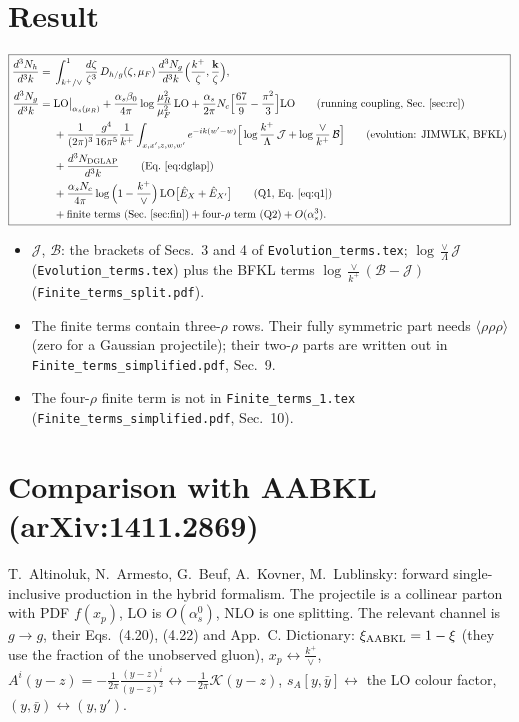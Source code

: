 \documentclass[9pt]{article}
\numberwithin{equation}{section}
\begin{document}
\section{Result}\label{sec:res}
\begin{equation}
\boxed{\begin{aligned}
\frac{d^3N_h}{d^3k}={}&\int_{k^+/\vee}^1\frac{d\zeta}{\zeta^3}\,D_{h/g}(\zeta,\mu_F)\,\frac{d^3N_g}{d^3k}\Big(\frac{k^+}{\zeta},\frac{\mathbf k}{\zeta}\Big),\\
\frac{d^3N_g}{d^3k}={}&{\rm LO}\big|_{\alpha_s(\mu_R)}+\frac{\alpha_s\beta_0}{4\pi}\log\frac{\mu_R^2}{\mu_F^2}\,{\rm LO}+\frac{\alpha_s}{2\pi}N_c\Big[\frac{67}{9}-\frac{\pi^2}{3}\Big]{\rm LO}\qquad\text{(running coupling, Sec.~\ref{sec:rc})}\\
&+\frac{1}{(2\pi)^{3}}\frac{g^{4}}{16\pi^{5}}\frac{1}{k^{+}}\int_{x,x',z,w,w'}e^{-ik(w'-w)}\Big[\log\frac{k^+}{\Lambda}\,\mathcal J+\log\frac{\vee}{k^+}\,\mathcal B\Big]\qquad\text{(evolution: JIMWLK, BFKL)}\\
&+\frac{d^3N_{\rm DGLAP}}{d^3k}\qquad\text{(Eq.~\eqref{eq:dglap})}\\
&+\frac{\alpha_sN_c}{4\pi}\log\Big(1-\frac{k^+}{\vee}\Big)\,{\rm LO}\big[\hat E_X+\hat E_{X'}\big]\qquad\text{(Q1, Eq.~\eqref{eq:q1})}\\
&+\text{finite terms (Sec.~\ref{sec:fin})}+\text{four-}\rho\text{ term (Q2)}+O(\alpha_s^3).
\end{aligned}}
\end{equation}
\begin{itemize}
\item $\mathcal J$, $\mathcal B$: the brackets of Secs.~3 and 4 of \texttt{Evolution\_terms.tex}; $\log\frac{\vee}{\Lambda}\mathcal J$ (\texttt{Evolution\_terms.tex}) plus the BFKL terms $\log\frac{\vee}{k^+}(\mathcal B-\mathcal J)$ (\texttt{Finite\_terms\_split.pdf}).
\item The finite terms contain three-$\rho$ rows. Their fully symmetric part needs $\langle\rho\rho\rho\rangle$ (zero for a Gaussian projectile); their two-$\rho$ parts are written out in \texttt{Finite\_terms\_simplified.pdf}, Sec.~9.
\item The four-$\rho$ finite term is not in \texttt{Finite\_terms\_1.tex} (\texttt{Finite\_terms\_simplified.pdf}, Sec.~10).
\end{itemize}

\section{Comparison with AABKL (arXiv:1411.2869)}\label{sec:aabkl}
T.~Altinoluk, N.~Armesto, G.~Beuf, A.~Kovner, M.~Lublinsky: forward single-inclusive production in the hybrid formalism. The projectile is a collinear parton with PDF $f(x_p)$, LO is $O(\alpha_s^0)$, NLO is one splitting. The relevant channel is $g\to g$, their Eqs.~(4.20), (4.22) and App.~C. Dictionary: $\xi_{\rm AABKL}=1-\xi$ (they use the fraction of the unobserved gluon), $x_p\leftrightarrow\frac{k^+}{\vee}$, $A^i(y-z)=-\frac{1}{2\pi}\frac{(y-z)^i}{(y-z)^2}\leftrightarrow-\frac{1}{2\pi}\mathcal K(y-z)$, $s_A[y,\bar y]\leftrightarrow$ the LO colour factor, $(y,\bar y)\leftrightarrow(y,y')$.
\end{document}

